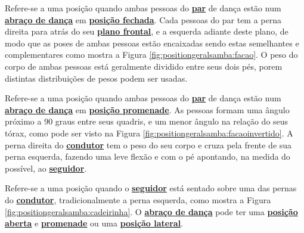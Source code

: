 \begin{definition}
\label{def:facao-position} 
Refere-se a uma posição quando ambas pessoas do \hyperref[def:Par]{\textbf{par}} de dança
estão num \hyperref[def:abracodedanca]{\textbf{abraço de dança}}
em \hyperref[def:closed-position]{\textbf{posição fechada}}.
Cada pessoas do par tem a perna direita para atrás do seu \hyperref[def:PlanoFrontal]{\textbf{plano frontal}},
e a esquerda adiante deste plano, de modo que as poses de ambas pessoas estão
encaixadas sendo estas semelhantes e complementares como mostra a Figura \ref{fig:positiongeralsamba:facao}.
O peso do corpo de ambas pessoas está geralmente dividido entre seus dois pés,
porem distintas distribuições de pesos podem ser usadas.
\end{definition}

\begin{definition}
\label{def:facao-invertido-position} 
Refere-se a uma posição quando ambas pessoas do \hyperref[def:Par]{\textbf{par}} 
de dança estão num \hyperref[def:abracodedanca]{\textbf{abraço de dança}}
em \hyperref[def:promenade-position]{\textbf{posição promenade}}.
As pessoas formam uma ângulo próximo a 90 graus entre seus quadris,
e um menor ângulo na relação do seus tórax, como pode ser visto na Figura \ref{fig:positiongeralsamba:facaoinvertido}.
A perna direita do \hyperref[def:Condutor]{\textbf{condutor}} tem o peso do seu corpo e 
cruza pela frente de sua perna esquerda, fazendo uma leve flexão e com o pé apontando,
na medida do possível, ao \hyperref[def:Seguidor]{\textbf{seguidor}}.
\end{definition}

\begin{definition}
\label{def:cadeirinha-position} 
Refere-se a uma posição quando o \hyperref[def:Seguidor]{\textbf{seguidor}} 
está sentado sobre uma das pernas do \hyperref[def:Condutor]{\textbf{condutor}},
tradicionalmente a perna esquerda, como mostra a Figura \ref{fig:positiongeralsamba:cadeirinha}.
O \hyperref[def:abracodedanca]{\textbf{abraço de dança}} pode ter 
uma \hyperref[def:open-position]{\textbf{posição aberta}} e 
\hyperref[def:promenade-position]{\textbf{promenade}}
ou uma  \hyperref[def:lateral-position]{\textbf{posição lateral}}.
\end{definition}

